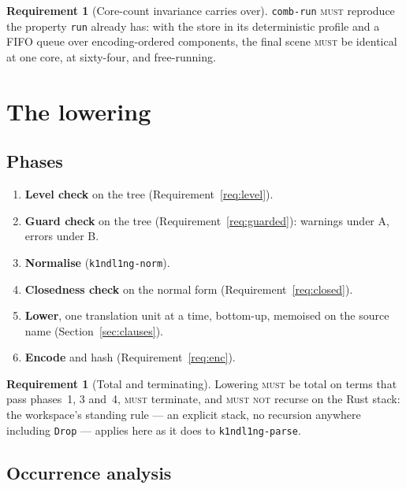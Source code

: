 \documentclass[11pt,a4paper]{article}
\newcommand{\code}[1]{\texttt{#1}}
\newcommand{\MUST}{\textsc{must}}
\newcommand{\MUSTNOT}{\textsc{must not}}
\theoremstyle{definition}
\newtheorem{requirement}[definition]{Requirement}
\theoremstyle{plain}
\begin{document}
\begin{requirement}[Core-count invariance carries over]\label{req:cores}
\code{comb-run} \MUST{} reproduce the property \code{run} already has: with
the store in its deterministic profile and a FIFO queue over encoding-ordered
components, the final scene \MUST{} be identical at one core, at sixty-four,
and free-running.
\end{requirement}

\section{The lowering}\label{sec:lower}

\subsection{Phases}

\begin{enumerate}[leftmargin=1.6em]
\item \textbf{Level check} on the tree (Requirement~\ref{req:level}).
\item \textbf{Guard check} on the tree (Requirement~\ref{req:guarded}):
warnings under A, errors under B.
\item \textbf{Normalise} (\code{k1ndl1ng-norm}).
\item \textbf{Closedness check} on the normal form
(Requirement~\ref{req:closed}).
\item \textbf{Lower}, one translation unit at a time, bottom-up, memoised on
the source name (Section~\ref{sec:clauses}).
\item \textbf{Encode} and hash (Requirement~\ref{req:enc}).
\end{enumerate}

\begin{requirement}[Total and terminating]\label{req:total}
Lowering \MUST{} be total on terms that pass phases~1, 3 and~4, \MUST{}
terminate, and \MUSTNOT{} recurse on the Rust stack: the workspace's standing
rule --- an explicit stack, no recursion anywhere including \code{Drop} ---
applies here as it does to \code{k1ndl1ng-parse}.
\end{requirement}

\subsection{Occurrence analysis}\label{sec:occ}
\end{document}
